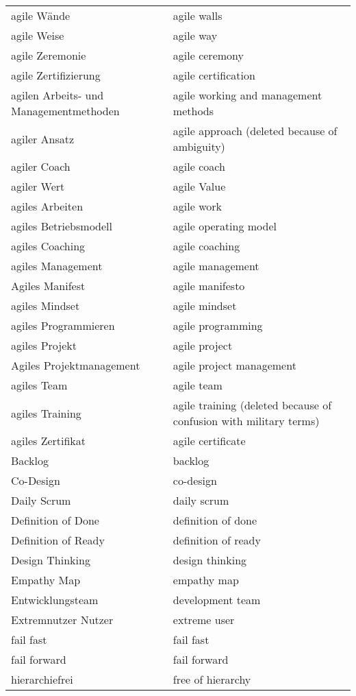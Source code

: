 \begin{spacing}{.5}
\begin{longtable}{ p{} p{}}
    agile Wände & agile walls \\
    agile Weise & agile way \\
    agile Zeremonie & agile ceremony \\
    agile Zertifizierung & agile certification \\
    agilen Arbeits- und Managementmethoden & agile working and management methods \\
    agiler Ansatz & agile approach (deleted because of ambiguity) \\
    agiler Coach & agile coach \\
    agiler Wert & agile Value \\
    agiles Arbeiten & agile work \\
    agiles Betriebsmodell & agile operating model \\
    agiles Coaching & agile coaching \\
    agiles Management & agile management \\
    Agiles Manifest & agile manifesto \\
    agiles Mindset & agile mindset \\
    agiles Programmieren & agile programming \\
    agiles Projekt & agile project \\
    Agiles Projektmanagement & agile project management \\
    agiles Team & agile team \\
    agiles Training & agile training (deleted because of confusion with military terms) \\
    agiles Zertifikat & agile certificate \\
    Backlog & backlog \\
    Co-Design & co-design \\
    Daily Scrum & daily scrum \\
    Definition of Done & definition of done \\
    Definition of Ready & definition of ready \\
    Design Thinking & design thinking \\
    Empathy Map & empathy map \\
    Entwicklungsteam & development team \\
    Extremnutzer Nutzer & extreme user \\
    fail fast & fail fast \\
    fail forward & fail forward \\
    hierarchiefrei & free of hierarchy \\

\end{longtable}
\end{spacing}
